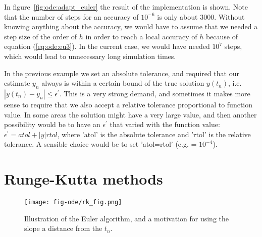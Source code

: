 \documentclass[graybox,sectrefs,envcountresetchap,open=right,final]{svmonodo}
\newenvironment{graybox2admon}[1][]{
\begin{graybox2mdframed}[frametitle=#1]
}
{
\end{graybox2mdframed}
}
\begin{document}
In figure~\ref{fig:ode:adapt_euler} the result of the implementation is shown. 
Note that the number of steps for an accuracy of $10^{-6}$ is only about 3000. Without knowing anything about the accuracy, we would have to assume
that we needed a step size of the order of $h$ in order to reach a local accuracy of $h$ because of equation (\ref{eq:ode:eu3}). In the current case,
we would have needed $10^7$ steps, which would lead to unnecessary long simulation times.


\begin{graybox2admon}[Local error and bounds]
In the previous example we set an absolute tolerance, and required that our estimate $y_n$ always is within a certain bound
of the true  solution $y(t_n)$, i.e.~$|y(t_n)-y_n|\le\epsilon^\prime$. This is a very strong demand, and sometimes it makes more 
sense to require that we also accept a relative tolerance proportional to function value. In some areas the solution might have a very large
value, and then another possibility would be to have an $\epsilon^\prime$ that varied with the function value: $\epsilon^\prime = atol +|y|rtol$, where 'atol' is the absolute tolerance and 'rtol' is the relative tolerance. A sensible choice would be to set 'atol=rtol' (e.g. = $10^{-4}$).
\end{graybox2admon}




\section{Runge-Kutta methods}

\begin{figure}[!ht]  %
  \centerline{\texttt{[image: fig-ode/rk\_fig.png]}}
  \caption{
  Illustration of the Euler algorithm, and a motivation for using the slope a distance from the $t_n$.\label{fig:ode:rk}
  }
\end{figure}
\end{document}
